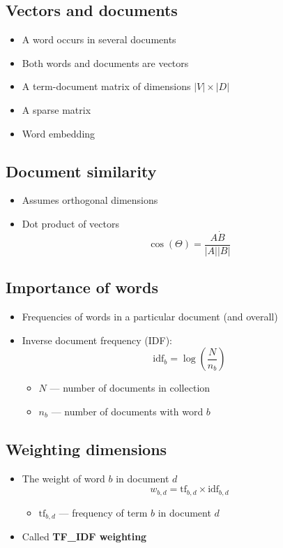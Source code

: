 \documentclass{article}
\begin{document}
    \subsection{Vectors and documents}
    \begin{itemize}
        \item A word occurs in several documents
        \item Both words and documents are vectors
        \item A term-document matrix of dimensions $|V| \times |D|$
        \item A sparse matrix
        \item Word embedding
    \end{itemize}

    \subsection{Document similarity}
    \begin{itemize}
        \item Assumes orthogonal dimensions
        \item Dot product of vectors
        \[ \cos(\Theta) = \frac{A \dot B}{|A||B|} \]
    \end{itemize}

    \subsection{Importance of words}
    \begin{itemize}
        \item Frequencies of words in a particular document (and overall)
        \item Inverse document frequency (IDF):
        \[ \text{idf}_b = \log\left(\frac{N}{n_b}\right) \]
        \begin{itemize}
            \item $N$ --- number of documents in collection
            \item $n_b$ --- number of documents with word $b$
        \end{itemize}
    \end{itemize}

    \subsection{Weighting dimensions}
    \begin{itemize}
        \item The weight of word $b$ in document $d$
        \[ w_{b, d} = \text{tf}_{b, d} \times \text{idf}_{b, d} \]
        \begin{itemize}
            \item $\text{tf}_{b, d}$ --- frequency of term $b$ in document $d$
        \end{itemize}
        \item Called \textbf{TF{\_}IDF weighting}
    \end{itemize}
\end{document}
